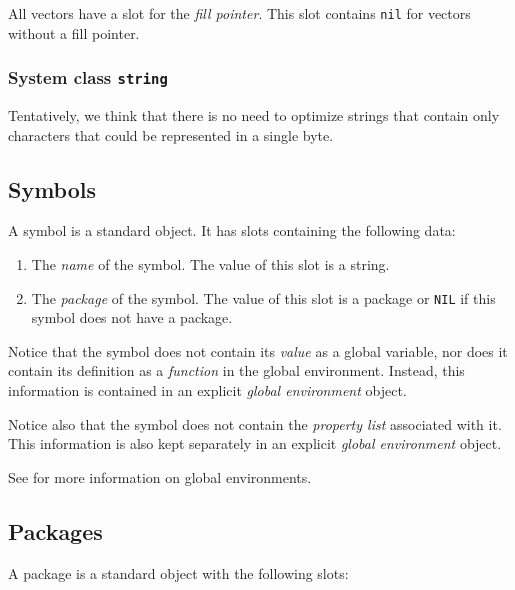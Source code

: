 All vectors have a slot for the \emph{fill pointer}.  This slot
contains \texttt{nil} for vectors without a fill pointer.

\subsubsection{System class \texttt{string}}

Tentatively, we think that there is no need to optimize strings that
contain only characters that could be represented in a single byte.

\subsection{Symbols}

A symbol is a standard object.  It has slots containing the following
data:

\begin{enumerate}
\item The \emph{name} of the symbol.  The value of this slot is a
  string.
\item The \emph{package} of the symbol.  The value of this slot is a
  package or \texttt{NIL} if this symbol does not have a package.
\end{enumerate}

Notice that the symbol does not contain its \emph{value} as a global
variable, nor does it contain its definition as a \emph{function} in
the global environment.  Instead, this information is contained in an
explicit \emph{global environment} object.

Notice also that the symbol does not contain the \emph{property list}
associated with it.  This information is also kept separately in an
explicit \emph{global environment} object.

See  for more information on
global environments.

\subsection{Packages}

A package is a standard object with the following slots:

